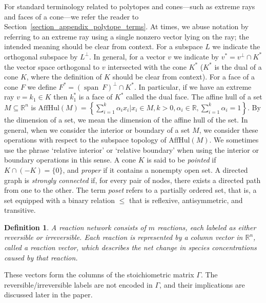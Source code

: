 \documentclass{article}
\newtheorem{define}{Definition}
\newcommand{\spans}{\operatorname{span}}
\begin{document}
 For standard terminology related to polytopes and cones—such as extreme rays and faces of a cone—we refer the reader to Section~\ref{section_appendix_polytope_terms}. At times, we abuse notation by referring to an extreme ray using a single nonzero vector lying on the ray; the intended meaning should be clear from context. For a subspace $L$ we indicate the orthogonal subspace by $L^{\perp}$. In general, for a vector $v$ we indicate by $v^* = v^{\perp} \cap K^*$ the vector space orthogonal to $v$ intersected with the cone $K^*$ ($K^*$ is the dual of a cone $K$, where the definition of $K$ should be clear from context). For a face of a cone $F$ we define $F^* = (\spans \ F)^{\perp} \cap K^*$. In particular, if we have an extreme ray $v = k_1 \in K$ then $k_1^*$ is a face of $K^*$ called the dual face. The affine hull of a set $M \subseteq \mathbb{R}^n$ is $\mbox{AffHul}(M)= \left\{ \sum_{i=1}^k \alpha_i x_i | x_i \in M, k > 0, \alpha_i \in \mathbb{R}, \sum_{i=1}^k \alpha_i = 1 \right\}$. By the dimension of a set, we mean the dimension of the affine hull of the set. In general, when we consider the interior or boundary of a set $M$, we consider these operations with respect to the subspace topology of $\mbox{AffHul}(M)$. We sometimes use the phrase `relative interior' or `relative boundary' when using the interior or boundary operations in this sense. A cone \( K \) is said to be \textit{pointed} if \( K \cap (-K) = \{0\} \), and \textit{proper} if it contains a nonempty open set. A directed graph is \textit{strongly connected} if, for every pair of nodes, there exists a directed path from one to the other. The term \textit{poset} refers to a partially ordered set, that is, a set equipped with a binary relation \( \leq \) that is reflexive, antisymmetric, and transitive.


\begin{define}
    A \textit{reaction network} consists of \( m \) reactions, each labeled as either reversible or irreversible. Each reaction is represented by a column vector in \( \mathbb{R}^n \), called a \textit{reaction vector}, which describes the net change in species concentrations caused by that reaction. 




    

    
\end{define}

These vectors form the columns of the stoichiometric matrix \( \Gamma \). The reversible/irreversible labels are not encoded in \( \Gamma \), and their implications are discussed later in the paper.
\end{document}
